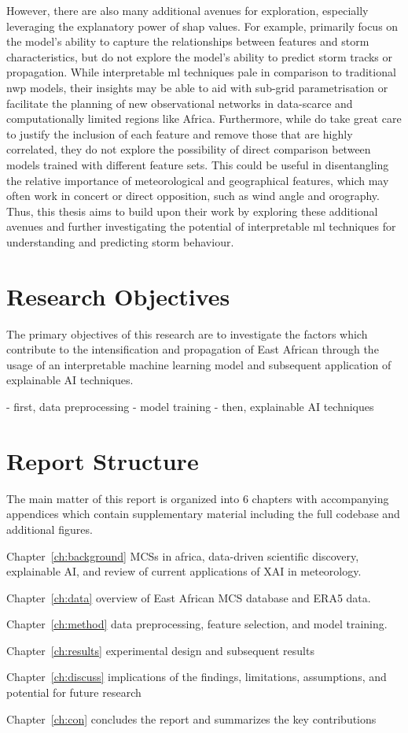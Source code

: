 However, there are also many additional avenues for exploration, especially leveraging the explanatory power of \acrshort{shap} values. For example, \cite{Hunt2024} primarily focus on the model's ability to capture the relationships between features and storm characteristics, but do not explore the model's ability to predict storm tracks or propagation. While interpretable \acrshort{ml} techniques pale in comparison to traditional \acrfull{nwp} models, their insights may be able to aid with sub-grid parametrisation or facilitate the planning of new observational networks in data-scarce and computationally limited regions like Africa. Furthermore, while \cite{Hunt2024} do take great care to justify the inclusion of each feature and remove those that are highly correlated, they do not explore the possibility of direct comparison between models trained with different feature sets. This could be useful in disentangling the relative importance of meteorological and geographical features, which may often work in concert or direct opposition, such as wind angle and orography. Thus, this thesis aims to build upon their work by exploring these additional avenues and further investigating the potential of interpretable \acrshort{ml} techniques for understanding and predicting storm behaviour.

\section{Research Objectives}

The primary objectives of this research are to investigate the factors which contribute to the intensification and propagation of East African  through the usage of an interpretable machine learning model and subsequent application of explainable AI techniques. 

- first, data preprocessing
- model training
- then, explainable AI techniques

\section{Report Structure}

The main matter of this report is organized into 6 chapters with accompanying appendices which contain supplementary material including the full codebase and additional figures.

Chapter~\ref{ch:background} MCSs in africa, data-driven scientific discovery, explainable AI, and review of current applications of XAI in meteorology. 

Chapter~\ref{ch:data} overview of East African MCS database and ERA5 data. 

Chapter~\ref{ch:method} data preprocessing, feature selection, and model training. 

Chapter~\ref{ch:results}  experimental design and subsequent results

Chapter~\ref{ch:discuss} implications of the findings, limitations, assumptions, and potential for future research

Chapter~\ref{ch:con} concludes the report and summarizes the key contributions

